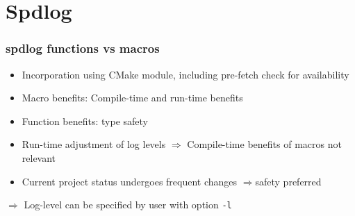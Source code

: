 \section{Spdlog}

\begin{frame}
    \frametitle{spdlog functions vs macros}

    \begin{itemize}
        \item Incorporation using CMake module, including pre-fetch check for availability
        \item Macro benefits: Compile-time and run-time benefits
        \item Function benefits: type safety
        \item Run-time adjustment of log levels $\Rightarrow$ Compile-time benefits of macros not relevant
        \item Current project status undergoes frequent changes $\Rightarrow $safety preferred
    \end{itemize}

    \bigskip

    $\Rightarrow$ Log-level can be specified by user with option \texttt{-l}

\end{frame}
